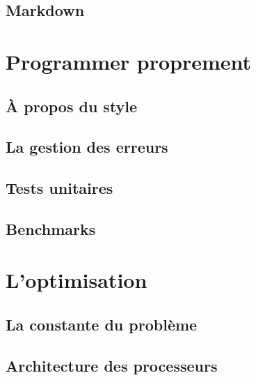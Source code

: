 \documentclass{minitelreport}
\begin{document}
\begin{refsection}
		\section{Markdown}
	\chapter{Programmer proprement}
	\label{chap:programmer_proprement}
		\section{À propos du style}
		\label{sec:_propos_du_style}
		
		\section{La gestion des erreurs}
		\label{sec:la_gestion_des_erreurs}
		
		\section{Tests unitaires}
		\label{sec:tests_unitaires}
		
		\section{Benchmarks}
		\label{sec:benchmarks}
			
	\chapter{L'optimisation}
	\label{chap:optimisation}
		\section{La constante du problème}
		\label{sec:la_constante_du_probl_me}
		\section{Architecture des processeurs}
		\label{sec:architecture_des_processeurs}


\end{refsection}
\end{document}
